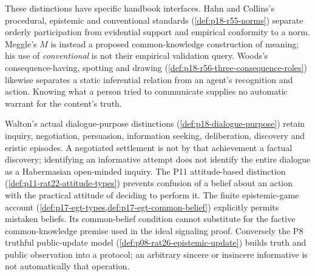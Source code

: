These distinctions have specific handbook interfaces. Hahn and Collins's
procedural, epistemic and conventional standards
(\cref{def:p18-r55-norms}) separate orderly participation from evidential
support and empirical conformity to a norm. Meggle's \(M\) is instead
a proposed common-knowledge construction of meaning; his use of
\emph{conventional} is not their empirical validation query. Woods's
consequence-having, spotting and drawing
(\cref{def:p18-r56-three-consequence-roles}) likewise separates a static
inferential relation from an agent's recognition and action. Knowing
what a person tried to communicate supplies no automatic warrant for
the content's truth.

Walton's actual dialogue-purpose distinctions
(\cref{def:p18-dialogue-purpose}) retain inquiry, negotiation, persuasion,
information seeking, deliberation, discovery and eristic episodes. A
negotiated settlement is not by that achievement a factual discovery;
identifying an informative attempt does not identify the entire dialogue
as a Habermasian open-minded inquiry. The P11 attitude-based distinction
(\cref{def:p11-rat22-attitude-types}) prevents confusion of a belief
about an action with the practical attitude of deciding to perform it.
The finite epistemic-game account
(\cref{def:p17-egt-types,def:p17-egt-common-belief}) explicitly permits
mistaken beliefs. Its common-belief condition cannot substitute for
the factive common-knowledge premise used in the ideal signaling proof.
Conversely the P8 truthful public-update model
(\cref{def:p08-rat26-epistemic-update}) builds truth and public observation
into a protocol; an arbitrary sincere or insincere informative is not
automatically that operation.

